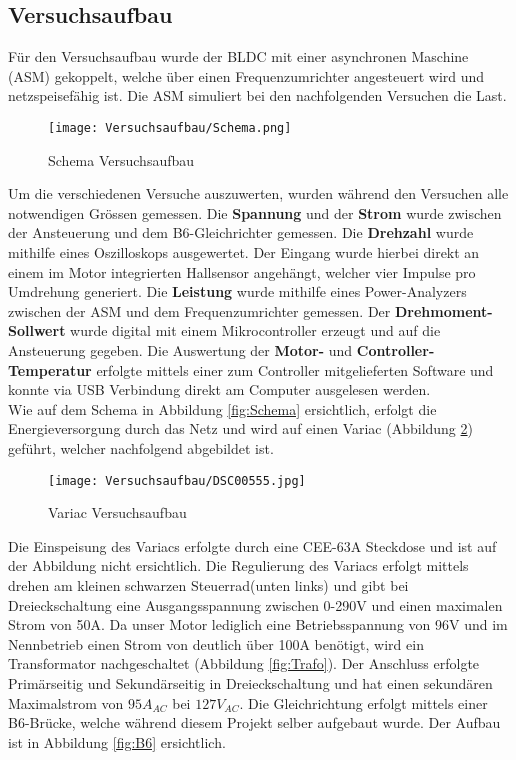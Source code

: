 \subsection{Versuchsaufbau}\label{subsec:Versuchsaufbau}
Für den Versuchsaufbau wurde der BLDC mit einer asynchronen Maschine (ASM) gekoppelt, welche über einen Frequenzumrichter angesteuert wird und netzspeisefähig ist. Die ASM simuliert bei den nachfolgenden Versuchen die Last.


\begin{figure}[H]
	\begin{center}
		\texttt{[image: Versuchsaufbau/Schema.png]}
		\caption{Schema Versuchsaufbau}
		\label{fig:Schema2}
	\end{center}
\end{figure}

Um die verschiedenen Versuche auszuwerten, wurden während den Versuchen alle notwendigen Grössen gemessen.
Die \textbf{Spannung} und der \textbf{Strom} wurde zwischen der Ansteuerung und dem B6-Gleichrichter gemessen. Die \textbf{Drehzahl} wurde mithilfe eines Oszilloskops ausgewertet. Der Eingang wurde hierbei direkt an einem im Motor integrierten Hallsensor angehängt, welcher vier Impulse pro Umdrehung generiert. Die \textbf{Leistung} wurde mithilfe eines Power-Analyzers zwischen der ASM und dem Frequenzumrichter gemessen. Der \textbf{Drehmoment-Sollwert} wurde digital mit einem Mikrocontroller erzeugt und auf die Ansteuerung gegeben. Die Auswertung der \textbf{Motor-} und \textbf{Controller-Temperatur} erfolgte mittels einer zum Controller mitgelieferten Software und konnte via USB Verbindung direkt am Computer ausgelesen werden.\\

Wie auf dem Schema in Abbildung \ref{fig:Schema} ersichtlich, erfolgt die Energieversorgung durch das Netz und wird auf einen Variac (Abbildung \ref{fig:Variac}) geführt, welcher nachfolgend abgebildet ist.

\begin{figure}[H]
	\begin{center}
		\texttt{[image: Versuchsaufbau/DSC00555.jpg]}
		\caption[Variac Versuchsaufbau]{Variac Versuchsaufbau}
		\label{fig:Variac}
	\end{center}
\end{figure}

Die Einspeisung des Variacs erfolgte durch eine CEE-63A Steckdose und ist auf der Abbildung nicht ersichtlich. Die Regulierung des Variacs erfolgt mittels drehen am kleinen schwarzen \glqq Steuerrad\grqq \space (unten links) und gibt bei Dreieckschaltung eine Ausgangsspannung zwischen 0-290V und einen maximalen Strom von 50A. Da unser Motor lediglich eine Betriebsspannung von 96V und im Nennbetrieb einen Strom von deutlich über 100A benötigt, wird ein Transformator nachgeschaltet (Abbildung \ref{fig:Trafo}). Der Anschluss erfolgte Primärseitig und Sekundärseitig in Dreieckschaltung und hat einen sekundären Maximalstrom von $95A_{AC}$ bei $127V_{AC}$. Die Gleichrichtung erfolgt mittels einer B6-Brücke, welche während diesem Projekt selber aufgebaut wurde. Der Aufbau ist in Abbildung \ref{fig:B6} ersichtlich.

